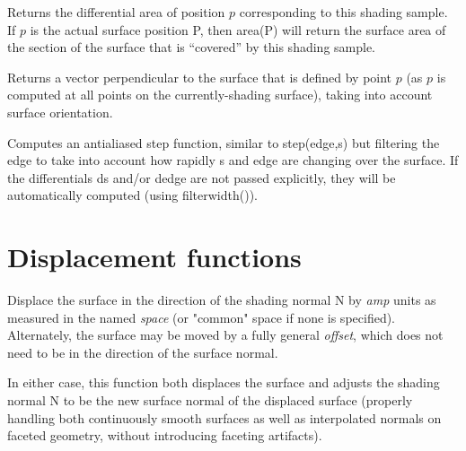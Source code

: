\documentclass[11pt,letterpaper]{book}
\def\N{{\cf N}\xspace}
\def\P{{\cf P}\xspace}
\def\commonspace{{\cf "common"} space\xspace}
\begin{document}
Returns the differential area of position $p$ corresponding to this
shading sample.  If $p$ is the actual surface position \P, then 
{\ce area(P)} will return the surface area of the section of the
surface that is ``covered'' by this shading sample.
\apiend

Returns a vector perpendicular to the surface that is defined by point
$p$ (as $p$ is computed at all points on the currently-shading surface),
taking into account surface orientation.
\apiend

Computes an antialiased step function, similar to {\cf step(edge,s)} but
filtering the edge to take into account how rapidly {\cf s} and {\cf edge}
are changing over the surface.  If the differentials {\cf ds} and/or
{\cf dedge} are not passed explicitly, they will be automatically 
computed (using {\cf filterwidth()}).
\apiend


\section{Displacement functions}
\label{sec:stdlib:displace}


Displace the surface in the direction of the shading normal \N by
\emph{amp} units as measured in the named \emph{space} (or \commonspace
if none is specified).  Alternately, the surface may be moved by a fully
general \emph{offset}, which does not need to be in the direction of the
surface normal.

In either case, this function both displaces the surface and adjusts the
shading normal \N to be the new surface normal of the displaced surface
(properly handling both continuously smooth surfaces as well as
interpolated normals on faceted geometry, without introducing faceting
artifacts).
\apiend
\end{document}
